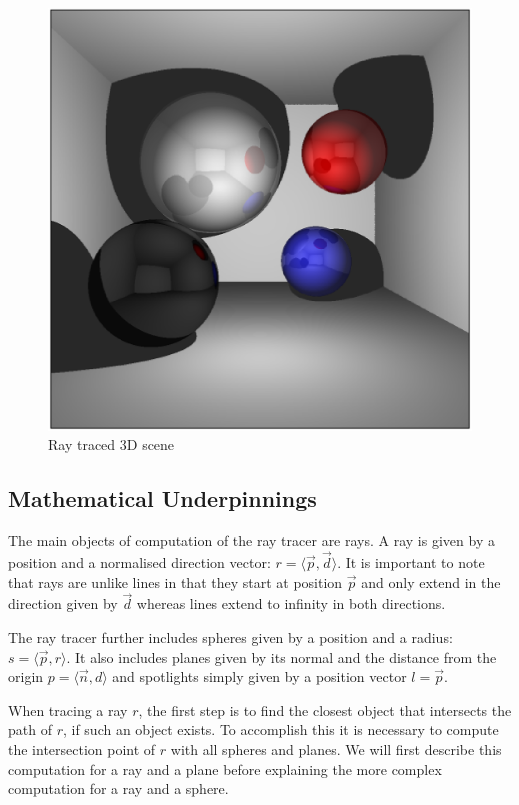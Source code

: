 \documentclass[11pt]{report}
\begin{document}
\begin{figure}[ht]
\begin{center}
\includegraphics[scale=0.5]{raytracerscreenshot.eps}
\end{center}
\caption{Ray traced 3D scene}
\label{raytracerscreenshot}
\end{figure}

\subsection{Mathematical Underpinnings}
The main objects of computation of the ray tracer are rays. A ray is given by a position and a normalised direction vector: $r = \langle \vec{p}, \vec{d} \rangle$. It is important to note that rays are unlike lines in that they start at position $\vec{p}$ and only extend in the direction given by $\vec{d}$ whereas lines extend to infinity in both directions.

The ray tracer further includes spheres given by a position and a radius: $s = \langle \vec{p}, r \rangle$. It also includes planes given by its normal and the distance from the origin $p = \langle \vec{n}, d \rangle$ and spotlights simply given by a position vector $l = \vec{p}$.

When tracing a ray $r$, the first step is to find the closest object that intersects the path of $r$, if such an object exists. To accomplish this it is necessary to compute the intersection point of $r$ with all spheres and planes. We will first describe this computation for a ray and a plane before explaining the more complex computation for a ray and a sphere.
\end{document}
